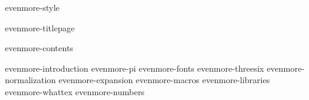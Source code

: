 \environment evenmore-style

\dontcomplain

\startdocument

    \component evenmore-titlepage

    \startfrontmatter
        \component evenmore-contents
    \stopfrontmatter

    \startbodymatter
        \component evenmore-introduction
        \component evenmore-pi
        \component evenmore-fonts
        \component evenmore-threesix
        \component evenmore-normalization
        \component evenmore-expansion
        \component evenmore-macros
        \component evenmore-libraries
        \component evenmore-whattex
        \component evenmore-numbers
    \stopbodymatter

\stopdocument
